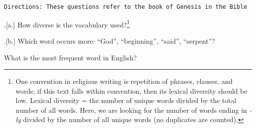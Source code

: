 \begin{homeworkProblem}
\texttt{Directions: These questions refer to the book of Genesis in the Bible}

\ex.[a.] How diverse is the vocabulary used?\footnote{One convention in religious writing is repetition of phrases, clauses, and words; if this text falls within convention, then its lexical diversity should be low. Lexical diversity = the number of unique words divided by the total number of all words. Here, we are looking for the number of words ending in {\sl -ly} divided by the number of all unique words (no duplicates are counted).} 

\ex.[b.] Which word occurs more: \textsf{``God'', ``beginning'', ``said'', ``serpent''}?

\end{homeworkProblem}


\begin{homeworkProblem}
    What is the most frequent word in English?
\end{homeworkProblem}




